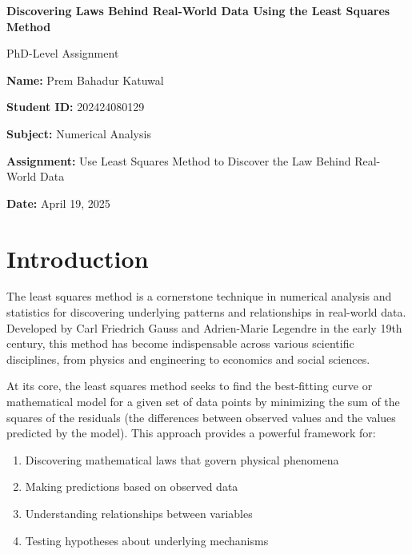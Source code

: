 \documentclass[12pt]{article}
\begin{document}
\begin{titlepage}
    \centering
    \vspace*{1cm}
    {\Huge\bfseries Discovering Laws Behind Real-World Data Using the Least Squares Method\par}
    \vspace{1.5cm}
    {\Large PhD-Level Assignment\par}
    \vspace{1.5cm}
    {\large\textbf{Name:} Prem Bahadur Katuwal\par}
    {\large\textbf{Student ID:} 202424080129\par}
    \vspace{1cm}
    {\large\textbf{Subject:} Numerical Analysis\par}
    \vspace{0.5cm}
    {\large\textbf{Assignment:} Use Least Squares Method to Discover the Law Behind Real-World Data\par}
    \vspace{0.5cm}
    {\large\textbf{Date:} April 19, 2025\par}
    \vfill
\end{titlepage}

\tableofcontents
\newpage

\section{Introduction}

The least squares method is a cornerstone technique in numerical analysis and statistics for discovering underlying patterns and relationships in real-world data. Developed by Carl Friedrich Gauss and Adrien-Marie Legendre in the early 19th century, this method has become indispensable across various scientific disciplines, from physics and engineering to economics and social sciences.

At its core, the least squares method seeks to find the best-fitting curve or mathematical model for a given set of data points by minimizing the sum of the squares of the residuals (the differences between observed values and the values predicted by the model). This approach provides a powerful framework for:

\begin{enumerate}
    \item Discovering mathematical laws that govern physical phenomena
    \item Making predictions based on observed data
    \item Understanding relationships between variables
    \item Testing hypotheses about underlying mechanisms
\end{enumerate}
\end{document}
